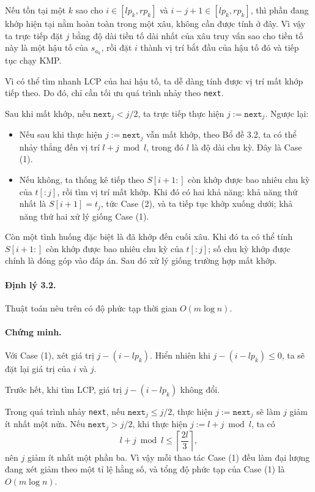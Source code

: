 \documentclass[11pt]{article}
\begin{document}
Nếu tồn tại một \(k\) sao cho \(i\in[lp_k,rp_k]\) và
\(i-j+1\in[lp_k,rp_k]\), thì phần đang khớp hiện tại nằm hoàn toàn trong một
xâu, không cần được tính ở đây. Vì vậy ta trực tiếp đặt \(j\) bằng độ dài tiền
tố dài nhất của xâu truy vấn sao cho tiền tố này là một hậu tố của \(s_{a_k}\),
rồi đặt \(i\) thành vị trí bắt đầu của hậu tố đó và tiếp tục chạy KMP.

Vì có thể tìm nhanh LCP của hai hậu tố, ta dễ dàng tính được vị trí mất khớp
tiếp theo. Do đó, chỉ cần tối ưu quá trình nhảy theo \texttt{next}.

Sau khi mất khớp, nếu \(\texttt{next}_j<j/2\), ta trực tiếp thực hiện
\(j:=\texttt{next}_j\). Ngược lại:
\begin{itemize}
  \item Nếu sau khi thực hiện \(j:=\texttt{next}_j\) vẫn mất khớp, theo Bổ đề
  3.2, ta có thể nhảy thẳng đến vị trí \(l+j\bmod l\), trong đó \(l\) là độ dài
  chu kỳ. Đây là Case (1).
  \item Nếu không, ta thống kê tiếp theo \(S[i+1:]\) còn khớp được bao nhiêu
  chu kỳ của \(t[:j]\), rồi tìm vị trí mất khớp. Khi đó có hai khả năng: khả
  năng thứ nhất là \(S[i+1]=t_j\), tức Case (2), và ta tiếp tục khớp xuống
  dưới; khả năng thứ hai xử lý giống Case (1).
\end{itemize}

Còn một tình huống đặc biệt là đã khớp đến cuối xâu. Khi đó ta có thể tính
\(S[i+1:]\) còn khớp được bao nhiêu chu kỳ của \(t[:j]\); số chu kỳ khớp được
chính là đóng góp vào đáp án. Sau đó xử lý giống trường hợp mất khớp.

\paragraph{Định lý 3.2.}
Thuật toán nêu trên có độ phức tạp thời gian \(O(m\log n)\).

\paragraph{Chứng minh.}
Với Case (1), xét giá trị \(j-(i-lp_k)\). Hiển nhiên khi
\(j-(i-lp_k)\le 0\), ta sẽ đặt lại giá trị của \(i\) và \(j\).

Trước hết, khi tìm LCP, giá trị \(j-(i-lp_k)\) không đổi.

Trong quá trình nhảy \texttt{next}, nếu \(\texttt{next}_j\le j/2\), thực hiện
\(j:=\texttt{next}_j\) sẽ làm \(j\) giảm ít nhất một nửa. Nếu
\(\texttt{next}_j>j/2\), khi thực hiện \(j:=l+j\bmod l\), ta có
\[
  l+j\bmod l\le \left\lceil\frac{2l}{3}\right\rceil,
\]
nên \(j\) giảm ít nhất một phần ba. Vì vậy mỗi thao tác Case (1) đều làm đại
lượng đang xét giảm theo một tỉ lệ hằng số, và tổng độ phức tạp của Case (1)
là \(O(m\log n)\).
\end{document}
